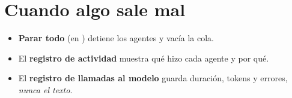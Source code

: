 \section{Cuando algo sale mal}
\begin{itemize}
\item \textbf{Parar todo} (en ) detiene los agentes y vacía la cola.
\item El \textbf{registro de actividad} muestra qué hizo cada agente y por qué.
\item El \textbf{registro de llamadas al modelo} guarda duración, tokens y errores, \emph{nunca el texto}.
\end{itemize}

